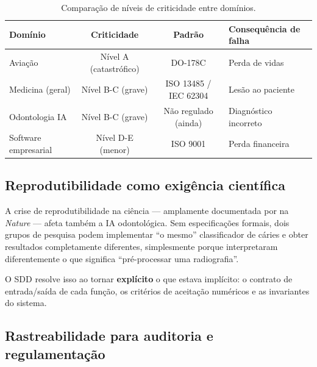 \begin{table}[H]
  \centering
  \caption{Comparação de níveis de criticidade entre domínios.}
  \label{tab:safety-comparison}
  \begin{tabularx}{\textwidth}{lccX}
    \toprule
    \textbf{Domínio} & \textbf{Criticidade} & \textbf{Padrão} & \textbf{Consequência de falha} \\
    \midrule
    Aviação & Nível A (catastrófico) & DO-178C & Perda de vidas \\
    Medicina (geral) & Nível B-C (grave) & ISO 13485 / IEC 62304 & Lesão ao paciente \\
    Odontologia IA & Nível B-C (grave) & Não regulado (ainda) & Diagnóstico incorreto \\
    Software empresarial & Nível D-E (menor) & ISO 9001 & Perda financeira \\
    \bottomrule
  \end{tabularx}
\end{table}


\subsection{Reprodutibilidade como exigência científica}

A crise de reprodutibilidade na ciência — amplamente documentada por
 na \textit{Nature} — afeta também
a IA odontológica. Sem especificações formais, dois grupos de pesquisa
podem implementar ``o mesmo'' classificador de cáries e obter resultados
completamente diferentes, simplesmente porque interpretaram diferentemente
o que significa ``pré-processar uma radiografia''.


O SDD resolve isso ao tornar \textbf{explícito} o que estava implícito:
o contrato de entrada/saída de cada função, os critérios de aceitação
numéricos e as invariantes do sistema.

\subsection{Rastreabilidade para auditoria e regulamentação}

